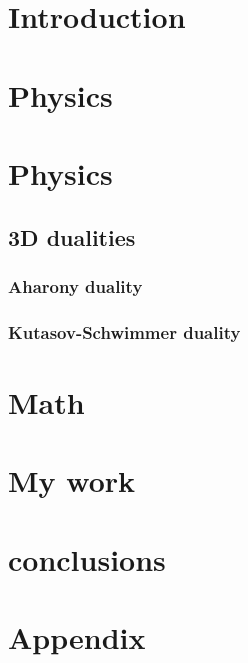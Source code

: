 


\maketitle

\chapter{Introduction}
\chapter{Physics}
\begin{comment}
~Non Renormalization stuff in 9509066 
\end{comment}






\chapter{Physics}
	
	
\section{3D dualities}
	\subsection{Aharony duality}
	\subsection{Kutasov-Schwimmer duality}
\chapter{Math}

\chapter{My work}

\chapter{conclusions}

\chapter{Appendix}

\nocite{*}


